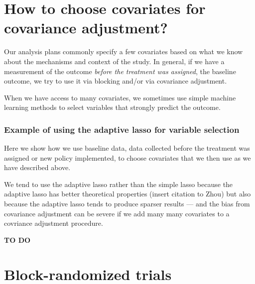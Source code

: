\documentclass[
  12pt,
]{book}
\theoremstyle{definition}
\theoremstyle{definition}
\theoremstyle{definition}
\theoremstyle{remark}
\begin{document}
\hypertarget{how-to-choose-covariates-for-covariance-adjustment}{%
\section{How to choose covariates for covariance
adjustment?}\label{how-to-choose-covariates-for-covariance-adjustment}}

Our analysis plans commonly specify a few covariates based on what we
know about the mechanisms and context of the study. In general, if we
have a measurement of the outcome \emph{before the treatment was
assigned}, the baseline outcome, we try to use it via blocking and/or
via covariance adjustment.

When we have access to many covariates, we sometimes use simple machine
learning methods to select variables that strongly predict the outcome.

\hypertarget{example-of-using-the-adaptive-lasso-for-variable-selection}{%
\subsubsection{Example of using the adaptive lasso for variable
selection}\label{example-of-using-the-adaptive-lasso-for-variable-selection}}

Here we show how we use baseline data, data collected before the
treatment was assigned or new policy implemented, to choose covariates
that we then use as we have described above.

We tend to use the adaptive lasso rather than the simple lasso because
the adaptive lasso has better theoretical properties (insert citation to
Zhou) but also because the adaptive lasso tends to produce sparser
results --- and the bias from covariance adjustment can be severe if we
add many many covariates to a covriance adjustment procedure.

\textbf{TO DO}

\hypertarget{blockrandanalysis}{%
\section{Block-randomized trials}\label{blockrandanalysis}}
\end{document}
